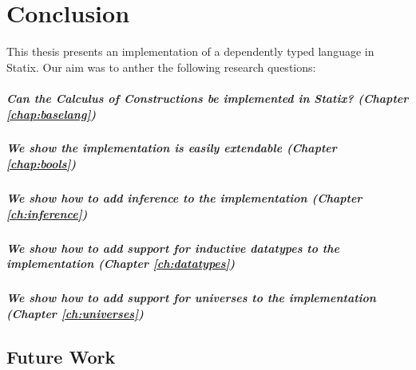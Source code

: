 \chapter{Conclusion}

This thesis presents an implementation of a dependently typed language in Statix. Our aim was to anther the following research questions:

\paragraph{Can the Calculus of Constructions be implemented in Statix? (Chapter \ref{chap:baselang})}

\paragraph{We show the implementation is easily extendable (Chapter \ref{chap:bools})}

\paragraph{We show how to add inference to the implementation (Chapter \ref{ch:inference})}

\paragraph{We show how to add support for inductive datatypes to the implementation (Chapter \ref{ch:datatypes})}

\paragraph{We show how to add support for universes to the implementation (Chapter \ref{ch:universes})}

\section{Future Work}